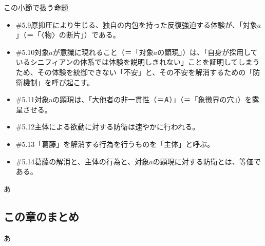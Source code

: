 \begin{note}{この小節で扱う命題}
\begin{itemize}
    \item{\#5.9}原抑圧により生じる、独自の内包を持った反復強迫する体験が、「対象$a$」（＝「〈物〉の断片」）である。
    \item{\#5.10}対象$a$が意識に現れること（＝「対象$a$の顕現」）は、「自身が採用しているシニフィアンの体系では体験を説明しきれない」ことを証明してしまうため、その体験を統御できない「不安」と、その不安を解消するための「防衛機制」を呼び起こす。
    \item{\#5.11}対象aの顕現は、「大他者の非一貫性（＝Ⱥ）」（＝「象徴界の穴」）を露呈させる。
    \item{\#5.12}主体による欲動に対する防衛は速やかに行われる。
    \item{\#5.13}「葛藤」を解消する行為を行うものを「主体」と呼ぶ。
    \item{\#5.14}葛藤の解消と、主体の行為と、対象$a$の顕現に対する防衛とは、等価である。
  \end{itemize}
\end{note}

あ

\subsection{この章のまとめ}\label{ux3053ux306eux7ae0ux306eux307eux3068ux3081}

あ
